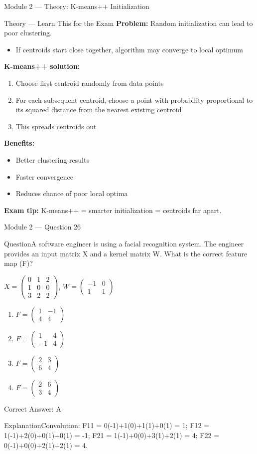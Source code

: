 \documentclass[aspectratio=169,10pt]{beamer}
\newcommand{\question}[1]{\begin{block}{Question}#1\end{block}}
\newcommand{\options}[4]{%
	\begin{enumerate}[label=\Alph*.,leftmargin=*]
		\item #1
		\item #2
		\item #3
		\item #4
	\end{enumerate}
}
\newcommand{\answerbox}[1]{\begin{exampleblock}{Correct Answer: #1}\end{exampleblock}}
\newcommand{\explain}[1]{\begin{block}{Explanation}#1\end{block}}
\newcommand{\theory}[1]{%
	\begin{block}{Theory --- Learn This for the Exam}
		\small #1
	\end{block}
}
\begin{document}
	\begin{frame}{Module 2 --- Theory: K-means++ Initialization}
		\theory{
			\textbf{Problem:} Random initialization can lead to poor clustering.
			\begin{itemize}
				\item If centroids start close together, algorithm may converge to local optimum
			\end{itemize}
			\textbf{K-means++ solution:}
			\begin{enumerate}
				\item Choose first centroid randomly from data points
				\item For each subsequent centroid, choose a point with probability proportional to its squared distance from the nearest existing centroid
				\item This spreads centroids out
			\end{enumerate}
			\textbf{Benefits:}
			\begin{itemize}
				\item Better clustering results
				\item Faster convergence
				\item Reduces chance of poor local optima
			\end{itemize}
			\textbf{Exam tip:} K-means++ = smarter initialization = centroids far apart.
		}
	\end{frame}
	
	\begin{frame}{Module 2 --- Question 26}
		\question{A software engineer is using a facial recognition system. The engineer provides an input matrix X and a kernel matrix W. What is the correct feature map (F)?}
		\begin{center}
			$X = \begin{pmatrix} 0 & 1 & 2 \\ 1 & 0 & 0 \\ 3 & 2 & 2 \end{pmatrix}$,
			$W = \begin{pmatrix} -1 & 0 \\ 1 & 1 \end{pmatrix}$
		\end{center}
		\options{$F = \begin{pmatrix} 1 & -1 \\ 4 & 4 \end{pmatrix}$}{$F = \begin{pmatrix} 1 & 4 \\ -1 & 4 \end{pmatrix}$}{$F = \begin{pmatrix} 2 & 3 \\ 6 & 4 \end{pmatrix}$}{$F = \begin{pmatrix} 2 & 6 \\ 3 & 4 \end{pmatrix}$}
		\answerbox{A}
		\explain{Convolution: F11 = 0(-1)+1(0)+1(1)+0(1) = 1; F12 = 1(-1)+2(0)+0(1)+0(1) = -1; F21 = 1(-1)+0(0)+3(1)+2(1) = 4; F22 = 0(-1)+0(0)+2(1)+2(1) = 4.}
	\end{frame}
	
\end{document}
